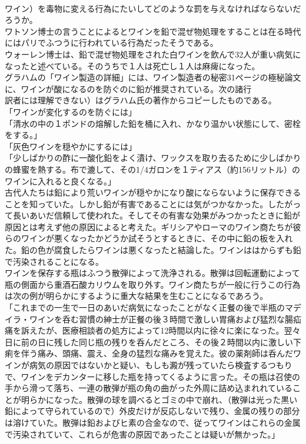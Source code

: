 \documentclass[8pt]{extreport}
\begin{document}
\begin{CJK}{UTF8}{min}
\\	ワイン）を毒物に変える行為にたいしてどのような罰を与えなければならないだろうか。
\\	ワトソン博士の言うことによるとワインを鉛で混ぜ物処理をすることは在る時代にはパリでふつうに行われている行為だったそうである。
\\	ウォーレン博士は、鉛で混ぜ物処理をされた白ワインを飲んで32人が重い病気になったと述べている。そのうちで１人は死亡し１人は麻痺になった。
\\	グラハムの「ワイン製造の詳細」には、ワイン製造者の秘密31ページの極秘論文に、ワインが酸になるのを防ぐのに鉛が推奨されている。次の諸行
\\	訳者には理解できない）はグラハム氏の著作からコピーしたものである。
\\	「ワインが変化するのを防ぐには」
\\	「清水の中の１ポンドの熔解した鉛を桶に入れ、かなり温かい状態にして、密栓をする。」
\\	「灰色ワインを穏やかにするには」
\\	「少しばかりの酢に一酸化鉛をよく漬け、ワックスを取り去るために少しばかりの蜂蜜を熱する。布で漉して、その1/4ガロンを１ティアス（約156リットル）のワインに入れると良くなる。」
\\	古代人たちは鉛により荒いワインが穏やかになり酸にならないように保存できることを知っていた。しかし鉛が有害であることには気がつかなかった。したがって長いあいだ信頼して使われた。そしてその有害な効果がみつかったときに鉛が原因とは考えず他の原因によると考えた。ギリシアやローマのワイン商たちが彼らのワインが悪くなったかどうか試そうとするときに、その中に鉛の板を入れた。鉛の色が腐食したらワインは悪くなったと結論した。ワインははからずも鉛で汚染されることになる。
\\	ワインを保存する瓶はふつう散弾によって洗浄される。散弾は回転運動によって瓶の側面から重酒石酸カリウムを取り外す。ワイン商たちが一般に行うこの行為は次の例が明らかにするように重大な結果を生むことになるであろう。
\\	「これまでの一生で一日のあいだ病気になったことがなく正餐の後で半瓶のマデイラ・ワインを呑む習慣の紳士が正餐の後３時間で激しい胃痛および猛烈な腸疝痛を訴えたが、医療相談者の処方によって12時間以内に徐々に楽になった。翌々日に前の日に残した同じ瓶の残りを呑んだところ、その後２時間以内に激しい下痢を伴う痛み、頭痛、震え、全身の猛烈な痛みを覚えた。彼の薬剤師は呑んだワインが病気の原因ではないかと疑い、もしも澱が残っていたら検査するつもりで、ワインをデカンターに移した瓶を持ってくるように言った。その瓶は召使の手から滑って落ち、一連の散弾が瓶の角の曲がった外周に詰め込まれれていることが明らかになった。散弾の球を調べるとゴミの中で崩れ、（散弾は光った黒い鉛によって守られているので）外皮だけが反応しないで残り、金属の残りの部分は溶けていた。散弾は鉛およびヒ素の合金なので、従ってワインはこれらの金属で汚染されていて、これらが危害の原因であったことは疑いが無かった。」

\end{CJK}
\end{document}
